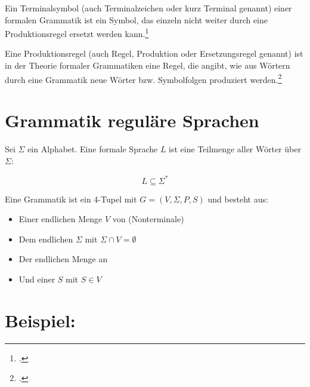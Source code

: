 \documentclass{lehramt-informatik-haupt}
\begin{document}
%

Ein Terminalsymbol (auch Terminalzeichen oder kurz Terminal genannt)
einer formalen Grammatik ist ein Symbol, das einzeln nicht weiter durch
eine Produktionsregel ersetzt werden kann.\footcite{wiki:terminal}

Eine Produktionsregel (auch Regel, Produktion oder Ersetzungsregel
genannt) ist in der Theorie formaler Grammatiken eine Regel, die angibt,
wie aus Wörtern durch eine Grammatik neue Wörter bzw. Symbolfolgen
produziert werden.\footcite{wiki:produktionsregel}

%

\section{Grammatik reguläre Sprachen}

Sei $\Sigma$ ein Alphabet. Eine formale Sprache $L$ ist eine Teilmenge
aller Wörter über $\Sigma$:

\begin{displaymath}
L \subseteq \Sigma^*
\end{displaymath}

\bigskip

\noindent
Eine Grammatik ist ein 4-Tupel mit $G = (V, \Sigma, P, S)$ und besteht aus:

\begin{itemize}
\item Einer endlichen Menge $V$ von  (Nonterminale)

\item Dem endlichen  $\Sigma$ mit $\Sigma \cap V
= \emptyset$

\item Der endlichen Menge an 

\item Und einer  $S$ mit $S \in V$
\end{itemize}

%

\section{Beispiel:}
\end{document}
